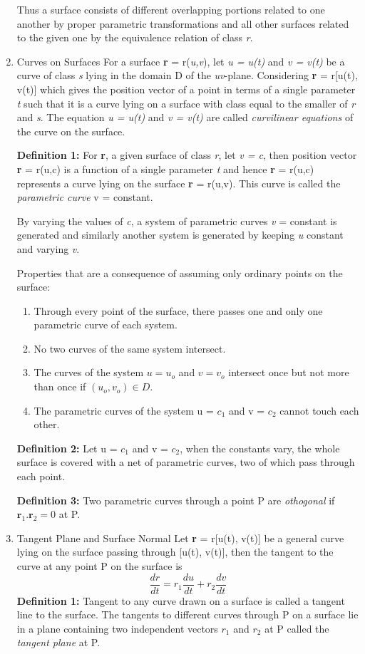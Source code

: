 \documentclass[11pt]{article}
\begin{document}
\begin{enumerate}
Thus a surface consists of different overlapping portions related to one another by proper parametric transformations and all other surfaces related to the given one by the equivalence relation of class \emph{r}.
\item Curves on Surfaces
\label{sec:orga8787e3}
For a surface \textbf{r} = r(\emph{u,v}), let \emph{u = u(t)} and \emph{v = v(t)} be a curve of class \emph{s} lying in the domain D of the \emph{uv}-plane. Considering \textbf{r} = r[u(t), v(t)] which gives the position vector of a point in terms of a single parameter \emph{t} such that it is a curve lying on a surface with class equal to the smaller of \emph{r} and \emph{s}. The equation \emph{u = u(t)} and \emph{v = v(t)} are called \emph{curvilinear equations} of the curve on the surface.

\textbf{Definition 1:} For \textbf{r}, a given surface of class \emph{r}, let \emph{v = c}, then position vector \textbf{r} = r(u,c) is a function of a single parameter \emph{t} and hence \textbf{r} = r(u,c) represents a curve lying on the surface \textbf{r} = r(u,v). This curve is called the \emph{parametric curve} v = constant.

By varying the values of \emph{c}, a system of parametric curves \emph{v} = constant is generated and similarly another system is generated by keeping \emph{u} constant and varying \emph{v}.

Properties that are a consequence of assuming only ordinary points on the surface:
\begin{enumerate}
\item Through every point of the surface, there passes one and only one parametric curve of each system.
\item No two curves of the same system intersect.
\item The curves of the system \(u=u_{o}\) and \(v=v_{o}\) intersect once but not more than once if \((u_{o},v_{o}) \in D\).
\item The parametric curves of the system u = \(c_{1}\) and v = \(c_{2}\) cannot touch each other.
\end{enumerate}

\textbf{Definition 2:} Let u = \(c_{1}\) and v = \(c_{2}\), when the constants vary, the whole surface is covered with a net of parametric curves, two of which pass through each point.

\textbf{Definition 3:} Two parametric curves through a point P are \emph{othogonal} if \(\textbf{r}_{1}.\textbf{r}_{2}= 0\) at P.
\item Tangent Plane and Surface Normal
\label{sec:orgc79e0b8}
Let \textbf{r} = r[u(t), v(t)] be a general curve lying on the surface passing through [u(t), v(t)], then the tangent to the curve at any point P on the surface is
\[
\frac{dr}{dt} = r_{1}\frac{du}{dt}+r_{2}\frac{dv}{dt}
\]
\textbf{Definition 1:} Tangent to any curve drawn on a surface is called a tangent line to the surface. The tangents to different curves through P on a surface lie in a plane containing two independent vectors \(r_{1}\) and \(r_{2}\) at P called the \emph{tangent plane} at P.


\end{enumerate}
\end{document}
